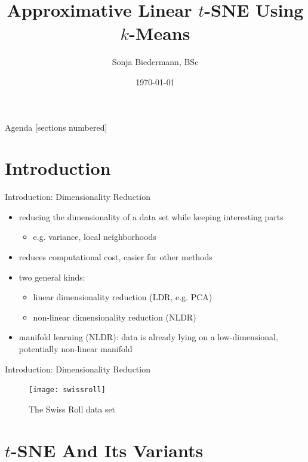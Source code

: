 \documentclass{beamer}
\title{Approximative Linear $t$-SNE Using $k$-Means}
\date{\today}
\author{Sonja Biedermann, BSc}
\institute{Fakultät für Informatik\\Universität Wien}
\begin{document}
\maketitle

\begin{frame}{Agenda}
    [sections numbered]
    \setcounter{tocdepth}{1}
    \tableofcontents
\end{frame}

\section{Introduction}

\begin{frame}[fragile]{Introduction: Dimensionality Reduction}
    \begin{itemize}
        \item reducing the dimensionality of a data set while keeping interesting parts
            \begin{itemize}
                \item[~] e.g. variance, local neighborhoods
            \end{itemize}
        \item reduces computational cost, easier for other methods
        \item two general kinds:
            \begin{itemize}
                \item linear dimensionality reduction (LDR, e.g. PCA)
                \item non-linear dimensionality reduction (NLDR)
            \end{itemize}
        \item manifold learning (NLDR): data is already lying on a
            low-dimensional, potentially non-linear manifold
    \end{itemize}
\end{frame}

\begin{frame}[fragile]{Introduction: Dimensionality Reduction}
    \begin{figure}[h]
        \centering
        \texttt{[image: swissroll]}
        \caption{The Swiss Roll data set}
    \end{figure}
\end{frame}

\section{$t$-SNE And Its Variants}
\end{document}

